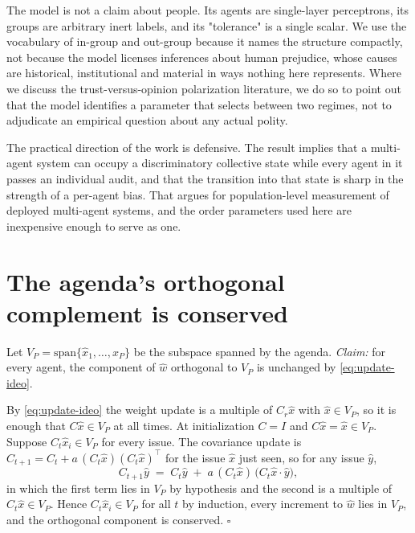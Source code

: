 \documentclass{article}
\begin{document}
The model is not a claim about people. Its agents are single-layer perceptrons,
its groups are arbitrary inert labels, and its "tolerance" is a single scalar. We
use the vocabulary of in-group and out-group because it names the structure
compactly, not because the model licenses inferences about human prejudice, whose
causes are historical, institutional and material in ways nothing here
represents. Where we discuss the trust-versus-opinion polarization
literature, we do so to point out that the model identifies a parameter that
selects between two regimes, not to adjudicate an empirical question about any
actual polity.

The practical direction of the work is defensive. The result implies that a
multi-agent system can occupy a discriminatory collective state while every agent
in it passes an individual audit, and that the transition into that state is
sharp in the strength of a per-agent bias. That argues for population-level
measurement of deployed multi-agent systems, and the order parameters used here
are inexpensive enough to serve as one.




\appendix
\section{The agenda's orthogonal complement is conserved}
\label{app:conserved}

Let $V_P=\mathrm{span}\{\hat{x}_1,\dots,\hat{x}_P\}$ be the subspace spanned by the
agenda. \emph{Claim:} for every agent, the component of $\hat{w}$ orthogonal to
$V_P$ is unchanged by \eqref{eq:update-ideo}.

By \eqref{eq:update-ideo} the weight update is a multiple of $C_r\hat{x}$ with
$\hat{x}\in V_P$, so it is enough that $C\hat{x}\in V_P$ at all times. At
initialization $C=I$ and $C\hat{x}=\hat{x}\in V_P$. Suppose $C_t\hat{x}_i\in V_P$
for every issue. The covariance update is
$C_{t+1}=C_t+a\,(C_t\hat{x})(C_t\hat{x})^{\!\top}$ for the issue $\hat{x}$ just
seen, so for any issue $\hat{y}$,
%
\begin{equation}
  C_{t+1}\hat{y} \;=\; C_t\hat{y} \;+\; a\,(C_t\hat{x})\,\bigl(C_t\hat{x}\cdot\hat{y}\bigr),
\end{equation}
%
in which the first term lies in $V_P$ by hypothesis and the second is a multiple of
$C_t\hat{x}\in V_P$. Hence $C_t\hat{x}_i\in V_P$ for all $t$ by induction, every
increment to $\hat{w}$ lies in $V_P$, and the orthogonal component is conserved.
$\square$
\end{document}
